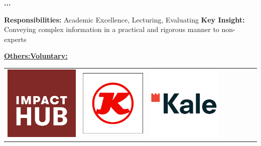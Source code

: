 \documentclass[10pt,a4paper]{altacv}
\begin{document}
 \textbf{...}

\textbf{Responsibilities:} Academic Excellence, Lecturing, Evaluating \newline
\textbf{Key Insight:} Conveying complex information in a practical and rigorous manner to non-experts
\begin{center}
    \hspace{25pt}\underline{\textbf{Others:}}\hspace{140pt}\underline{\textbf{Voluntary:}}\newline\divider
    {
    \renewcommand{\arraystretch}{2}
    \begin{tabular}{ |c c c c c|c c c| } \hline
 {\href{https://impacthubist.net}{\includegraphics[scale=0.15]{hub.png}}}
 &{\href{https://www.kaessbohrer.com/en}{\includegraphics[scale=0.17]{kass.png}}}
 &{\href{http://www.kale.com.tr/en}{\includegraphics[scale=0.17]{kale.png}}}

\end{tabular}}
\end{center}
\end{document}
